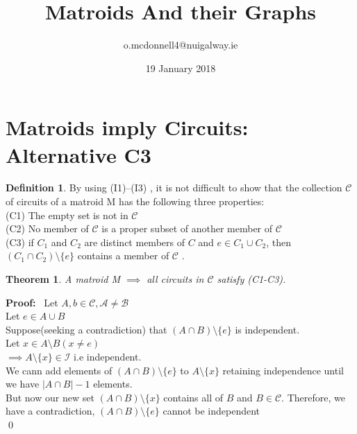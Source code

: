 \documentclass{article}
\title{Matroids And their Graphs}
\author{o.mcdonnell4@nuigalway.ie }
\date{19 January 2018}
\theoremstyle{plain}
\newtheorem{thm}{Theorem}[section]
\theoremstyle{definition}
\newtheorem{defn}{Definition}[section]
\theoremstyle{remark}
\newcommand\Proof{%
    \textbf{Proof:}~%
}
\begin{document}
\maketitle
 
 \section{Matroids imply Circuits: Alternative C3}
 \begin{defn} By using (I1)–(I3) , it is not difficult to show that the collection $\mathcal{C}$ of circuits of a matroid M has the following three properties:\\
(C1) The empty set is not in $\mathcal{C}$\\
(C2) No member of $\mathcal{C}$ is a proper subset of another member of $\mathcal{C}$\\
(C3) if $ C_1 $ and $ C_2 $ are distinct members of $ C $ and 
$ e \in C_1 \cup C_2 $, then $ (C_1 \cap C_2 ) \setminus \{e\} $ contains a member of $\mathcal{C}$ .
 \end{defn}
 
 \vspace{5mm}
 
 \begin{thm}
 A matroid M $\implies$ all circuits in $\mathcal{C}$ satisfy (C1-C3).
 \end{thm}
 
 \noindent\Proof Let $A,b \in \mathcal{C, A\neq B}$
 \\
 \noindent Let $e \in A \cup B$
 \\
 \noindent Suppose(seeking a contradiction) that $(A \cap B) \setminus \{e\}$ is independent.
 \\
 \noindent Let $x \in A \setminus B (x \neq e)$
 \\
 \noindent $\implies A \setminus \{x\} \in \mathcal{I}$ i.e independent.
 \\
 \noindent We cann add elements of $(A \cap B) \setminus \{e\}$ to $A \setminus \{x\}$ retaining independence until we have $|A \cap B| - 1$ elements.
 \\
 \noindent But now our new set $(A \cap B) \setminus \{x\}$ contains all of $B$ and $B \in \mathcal{C}$. Therefore, we have a contradiction, $(A \cap B) \setminus \{e\}$ cannot be independent
 \\
 \qed
 
\end{document}
